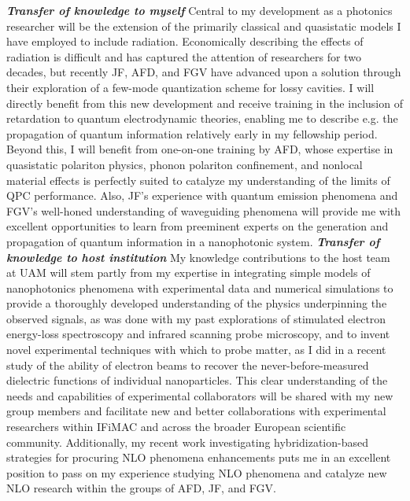 \documentclass[11pt,a4paper]{article}
\begin{document}
\textbf{\textit{Transfer of knowledge to myself}} Central to my development as a photonics researcher will be the extension of the primarily classical and quasistatic models I have employed to include radiation. Economically describing the effects of radiation is difficult and has captured the attention of researchers for two decades, but recently JF, AFD, and FGV have advanced upon a solution through their exploration of a few-mode quantization scheme for lossy cavities. I will directly benefit from this new development and receive training in the inclusion of retardation to quantum electrodynamic theories, enabling me to describe e.g. the propagation of quantum information relatively early in my fellowship period. Beyond this, I will benefit from one-on-one training by AFD, whose expertise in quasistatic polariton physics, phonon polariton confinement, and nonlocal material effects is perfectly suited to catalyze my understanding of the limits of QPC performance. Also, JF's experience with quantum emission phenomena and FGV's well-honed understanding of waveguiding phenomena will provide me with excellent opportunities to learn from preeminent experts on the generation and propagation of quantum information in a nanophotonic system. \textbf{\textit{Transfer of knowledge to host institution}} My knowledge contributions to the host team at UAM will stem partly from my expertise in integrating simple models of nanophotonics phenomena with experimental data and numerical simulations to provide a thoroughly developed understanding of the physics underpinning the observed signals, as was done with my past explorations of stimulated electron energy-loss spectroscopy\supercite{liu_continuous_2019} and infrared scanning probe microscopy\supercite{liberko_probing_2021}, and to invent novel experimental techniques with which to probe matter, as I did in a recent study of the ability of electron beams to recover the never-before-measured dielectric functions of individual nanoparticles.\supercite{olafsson_electron_2020} This clear understanding of the needs and capabilities of experimental collaborators will be shared with my new group members and facilitate new and better collaborations with experimental researchers within IFiMAC and across the broader European scientific community. Additionally, my recent work investigating hybridization-based strategies for procuring NLO phenomena enhancements puts me in an excellent position to pass on my experience studying NLO phenomena and catalyze new NLO research within the groups of AFD, JF, and FGV.
\end{document}
